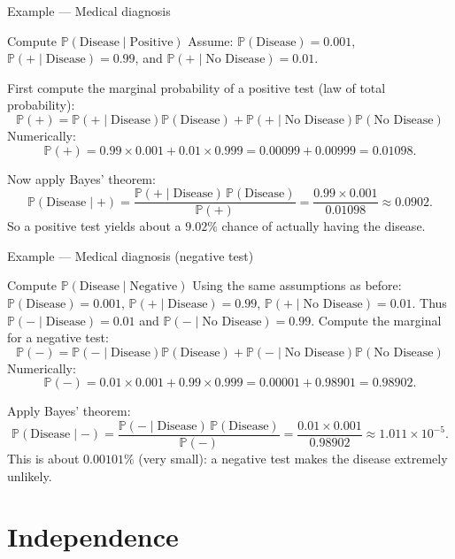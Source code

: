 \documentclass{beamer}
\renewcommand{\P}{\mathbb{P}}
\newcommand{\1}{\mathbf{1}}
\begin{document}
\begin{frame}{Example — Medical diagnosis}
  \begin{exampleblock}{Compute $\P(\text{Disease}\mid\text{Positive})$}
    \small
    Assume: $\P(\text{Disease})=0.001$, $\P(+\mid\text{Disease})=0.99$, and $\P(+\mid\text{No Disease})=0.01$.

    First compute the marginal probability of a positive test (law of total probability):
    \[
      \P(+) = \P(+\mid\text{Disease})\P(\text{Disease}) + \P(+\mid\text{No Disease})\P(\text{No Disease})
    \]
    Numerically:
    \[
      \P(+) = 0.99\times0.001 + 0.01\times0.999 = 0.00099 + 0.00999 = 0.01098.
    \]

    Now apply Bayes' theorem:
    \[
      \P(\text{Disease}\mid +) = \frac{\P(+\mid\text{Disease})\,\P(\text{Disease})}{\P(+)} = \frac{0.99\times0.001}{0.01098} \approx 0.0902.
    \]
    So a positive test yields about a $9.02\%$ chance of actually having the disease.
  \end{exampleblock}
\end{frame}

\begin{frame}{Example — Medical diagnosis (negative test)}
  \begin{exampleblock}{Compute $\P(\text{Disease}\mid\text{Negative})$}
    \small
    Using the same assumptions as before: $\P(\text{Disease})=0.001$, $\P(+\mid\text{Disease})=0.99$, $\P(+\mid\text{No Disease})=0.01$. Thus $\P(-\mid\text{Disease})=0.01$ and $\P(-\mid\text{No Disease})=0.99$. Compute the marginal for a negative test:
    \[
      \P(-)=\P(-\mid\text{Disease})\P(\text{Disease})+\P(-\mid\text{No Disease})\P(\text{No Disease})
    \]
    Numerically:
    \[
      \P(-)=0.01\times0.001 + 0.99\times0.999 = 0.00001 + 0.98901 = 0.98902.
    \]

    Apply Bayes' theorem:
    \[
      \P(\text{Disease}\mid -)=\frac{\P(-\mid\text{Disease})\,\P(\text{Disease})}{\P(-)}=\frac{0.01\times0.001}{0.98902}\approx 1.011\times10^{-5}.
    \]
    This is about $0.00101\%$ (very small): a negative test makes the disease extremely unlikely.
  \end{exampleblock}
\end{frame}

\section{Independence}
\end{document}
